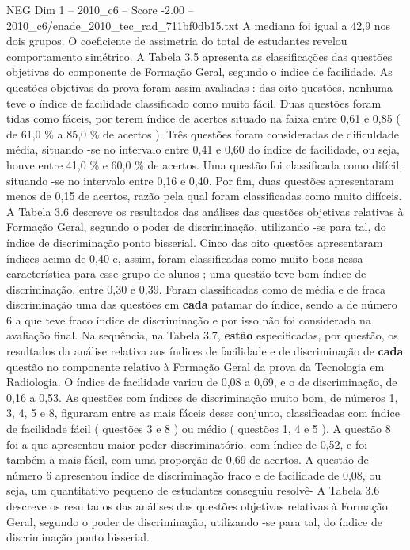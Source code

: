 \begin{textsample}{NEG Dim 1 – 2010\_c6 – Score -2.00 – 2010\_c6/enade\_2010\_tec\_rad\_711bf0db15.txt}
A mediana foi igual a 42,9 nos dois grupos.
O coeficiente de assimetria do total de estudantes revelou comportamento simétrico.
A Tabela 3.5 apresenta as classificações das questões objetivas do componente de Formação Geral, segundo o índice de facilidade.
As questões objetivas da prova foram assim avaliadas : das oito questões, nenhuma teve o índice de facilidade classificado como muito fácil.
Duas questões foram tidas como fáceis, por terem índice de acertos situado na faixa entre 0,61 e 0,85 ( de 61,0 \% a 85,0 \% de acertos ).
Três questões foram consideradas de dificuldade média, situando -se no intervalo entre 0,41 e 0,60 do índice de facilidade, ou seja, houve entre 41,0 \% e 60,0 \% de acertos.
Uma questão foi classificada como difícil, situando -se no intervalo entre 0,16 e 0,40.
Por fim, duas questões apresentaram menos de 0,15 de acertos, razão pela qual foram classificadas como muito difíceis.
A Tabela 3.6 descreve os resultados das análises das questões objetivas relativas à Formação Geral, segundo o poder de discriminação, utilizando -se para tal, do índice de discriminação ponto bisserial.
Cinco das oito questões apresentaram índices acima de 0,40 e, assim, foram classificadas como muito boas nessa característica para esse grupo de alunos ; uma questão teve bom índice de discriminação, entre 0,30 e 0,39.
Foram classificadas como de média e de fraca discriminação uma das questões em \textbf{cada} patamar do índice, sendo a de número 6 a que teve fraco índice de discriminação e por isso não foi considerada na avaliação final.
Na sequência, na Tabela 3.7, \textbf{estão} especificadas, por questão, os resultados da análise relativa aos índices de facilidade e de discriminação de \textbf{cada} questão no componente relativo à Formação Geral da prova da Tecnologia em Radiologia.
O índice de facilidade variou de 0,08 a 0,69, e o de discriminação, de 0,16 a 0,53.
As questões com índices de discriminação muito bom, de números 1, 3, 4, 5 e 8, figuraram entre as mais fáceis desse conjunto, classificadas com índice de facilidade fácil ( questões 3 e 8 ) ou médio ( questões 1, 4 e 5 ).
A questão 8 foi a que apresentou maior poder discriminatório, com índice de 0,52, e foi também a mais fácil, com uma proporção de 0,69 de acertos.
A questão de número 6 apresentou índice de discriminação fraco e de facilidade de 0,08, ou seja, um quantitativo pequeno de estudantes conseguiu resolvê- A Tabela 3.6 descreve os resultados das análises das questões objetivas relativas à Formação Geral, segundo o poder de discriminação, utilizando -se para tal, do índice de discriminação ponto bisserial.

\end{textsample}
